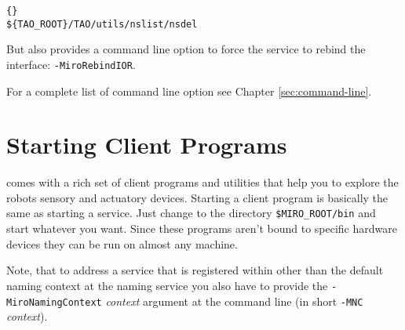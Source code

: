 \begin{lstlisting}[frame=tb]{}
${TAO_ROOT}/TAO/utils/nslist/nsdel
\end{lstlisting}

But \miro also provides a command line option to force the service to
rebind the interface: {\tt -MiroRebindIOR}.

For a complete list of command line option see Chapter
\ref{sec:command-line}.


\section{Starting Client Programs}

\miro comes with a rich set of client programs and utilities that help
you to explore the robots sensory and actuatory devices. Starting a
client program is basically the same as starting a service. Just
change to the directory {\tt \$MIRO\_ROOT/bin} and start whatever
you want. Since these programs aren't bound to specific hardware
devices they can be run on almost any machine.

Note, that to address a service that is registered within other than
the default naming context at the naming service you also have to
provide the {\tt -MiroNamingContext} {\em context} argument at the
command line (in short {\tt -MNC} {\em context}).

